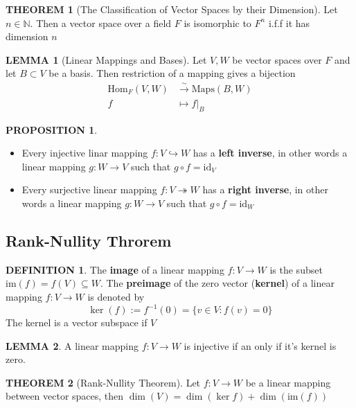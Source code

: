 \documentclass[10pt]{article}
\theoremstyle{definition}
\newtheorem{definition}{DEFINITION}[subsection]
\newtheorem{theorem}{THEOREM}[subsection]
\newcommand{\Hom}{\text{Hom}}
\newcommand{\Maps}{\text{Maps}}
\newcommand{\image}{\text{im}}
\newtheorem{lemma}{LEMMA}[subsection]
\newtheorem{prop}{PROPOSITION}[subsection]
\begin{document}
\begin{theorem}[The Classification of Vector Spaces by their Dimension]
    Let $n\in \mathbb{N}$. Then a vector space over a field $F$ is isomorphic to $F^n$ i.f.f it has dimension $n$
\end{theorem}

\begin{lemma}[Linear Mappings and Bases]
    Let $V,W$ be vector spaces over $F$ and let $B \subset V$ be a basis. Then restriction of a mapping gives a bijection
    \[\begin{split}
        \Hom_F(V,W) &\stackrel{\sim}{\rightarrow} \Maps(B,W)\\
        f &\mapsto f|_B
    \end{split}\]
\end{lemma}

\begin{prop}
    \begin{itemize}
        \item Every injective linar mapping $f:V \hookrightarrow W$ has a \textbf{left inverse}, in other words a linear mapping $g: W \rightarrow V$ such that $g \circ f = \text{id}_V$
        \item Every surjective linear mapping $f:V \twoheadrightarrow W$ has a \textbf{right inverse}, in other words a linear mapping $g: W \rightarrow V$ such that $g \circ f = \text{id}_W$
    \end{itemize}
\end{prop}

\subsection{Rank-Nullity Throrem}
\begin{definition}
    The \textbf{image} of a linear mapping $f: V \rightarrow W$ is the subset $\image(f) = f(V) \subseteq W$. The \textbf{preimage} of the zero vector (\textbf{kernel}) of a linear mapping $f: V \rightarrow W$ is denoted by $$\ker(f) := f^{-1}(0) = \{v \in V: f(v) = 0\}$$
    The kernel is a vector subspace if $V$
\end{definition}

\begin{lemma}
    A linear mapping $f: V \rightarrow W$ is injective if an only if it's kernel is zero.
\end{lemma}

\begin{theorem}[Rank-Nullity Theorem]
    Let $f: V \rightarrow W$ be a linear mapping between vector spaces, then $\dim(V) = \dim(\ker{f}) + \dim(\image(f))$
\end{theorem}
\end{document}
